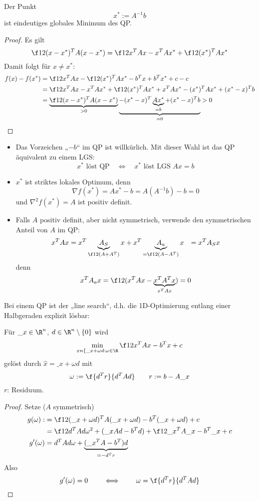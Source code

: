 \documentclass[11pt]{scrartcl}
\begin{document}
\begin{st} \label{4.10}
	Der Punkt
	\[
		x^* := A^{-1} b
	\]
	ist eindeutiges globales Minimum des QP.
	\begin{proof}
		Es gilt
		\[
			\f 12 (x-x^*)^T A(x-x^*) = \f 12 x^TAx - x^TAx^* + \f 12 (x^*)^TAx^*
		\]
		Damit folgt für $x \neq x^*$:
		\begin{align*}
			f(x) - f(x^*) &= \f 12 x^T Ax - \f 12 (x^*)^TAx^* - b^Tx + b^Tx^* + c - c \\
			&= \f 12 x^T Ax - x^T Ax^* + \f 12 (x^*)^T Ax^* + x^T Ax^* - (x^*)^T Ax^* + (x^* -x)^Tb \\
			&= \underbrace{\f 12(x-x^*)^T A(x-x^*)}_{>0} \underbrace{- (x^*-x)^T\underbrace{Ax^*}_{=b} + (x^*-x)^Tb}_{=0} > 0
		\end{align*}
	\end{proof}
	\begin{note}
		\begin{itemize}
			\item
				Das Vorzeichen „$-b$“ im QP ist willkürlich.
				Mit dieser Wahl ist das QP äquivalent zu einem LGS:
				\[
					x^* \text{ löst QP} \quad \iff \quad x^* \text{ löst LGS } Ax=b
				\]
			\item
				$x^*$ ist striktes lokales Optimum, denn
				\[
					\nabla f(x^*) = Ax^* - b = A(A^{-1}b) -b = 0
				\]
				und $\nabla^2 f(x^*) = A$ ist positiv definit.
			\item
				Falls $A$ positiv definit, aber nicht symmetrisch, verwende den symmetrischen Anteil von $A$ im QP:
				\begin{align*}
					x^T A x 
					&= x^T \underbrace{A_S}_{\f 12 (A + A^T)} x + x^T \underbrace{A_a}_{= \f 12 (A-A^T)} x 
					&= x^T A_S x
				\end{align*}
				denn
				\[
					x^T A_a x = \f 12 (x^T Ax - \underbrace{x^T A^T x}_{x^T A x}) = 0
				\]
		\end{itemize}
	\end{note}
\end{st}

Bei einem QP ist der „line search“, d.h. die 1D-Optimierung entlang einer Halbgeraden explizit lösbar:

\begin{st}[1D-Optimierung] \label{4.11}
	Für $\_x \in \R^n$, $d\in \R^n \setminus \{0\}$ wird
	\[
		\min_{x \/n \{\_x + \omega d : \omega \in \R} \f 12 x^T A x - b^T x + c
	\]
	gelöst durch $\hat x = \_x + \omega d$ mit
	\[
		\omega := \f {d^T r}{d^T A d} \qquad r := b - A\_x
	\]
	$r$: Residuum.
	\begin{proof}
		Setze ($A$ symmetrisch)
		\begin{align*}
			g(\omega) :&= \f 12 (\_x+\omega d)^TA(\_x + \omega d) - b^T(\_x + \omega d) +c \\
			&= \f 12 d^T Ad \omega^2 + (\_x Ad - b^T d) + \f 12 \_x^T A\_x - b^T \_x + c  \\
			g'(\omega) &= d^T Ad \omega + \underbrace{(\_x^TA - b^T)d}_{=-d^T r}
		\end{align*}
		Also
		\[
			g'(\omega) = 0 \qquad \iff \qquad \omega = \f {d^T r}{d^T A d}
		\]
	\end{proof}
\end{st}
\end{document}
